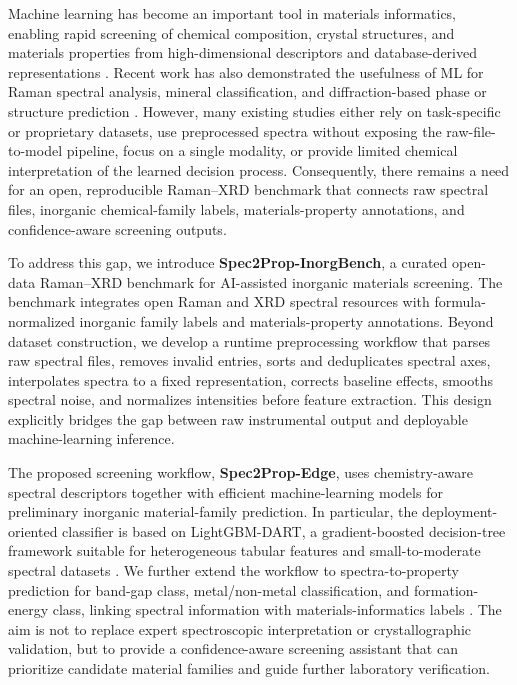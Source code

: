 Machine learning has become an important tool in materials informatics, enabling rapid screening of chemical composition, crystal structures, and materials properties from high-dimensional descriptors and database-derived representations \cite{jain2013materialsproject,ward2018matminer,choudhary2020jarvis,dunn2020matbench,riebesell2025matbenchdiscovery}. Recent work has also demonstrated the usefulness of ML for Raman spectral analysis, mineral classification, and diffraction-based phase or structure prediction \cite{dai2024libsraman,eranti2026ramanencoder,zhang2026physramannet,liu2026ramanclassificationreview,li2024pxrdgen,guo2024xrddeeplearning}. However, many existing studies either rely on task-specific or proprietary datasets, use preprocessed spectra without exposing the raw-file-to-model pipeline, focus on a single modality, or provide limited chemical interpretation of the learned decision process. Consequently, there remains a need for an open, reproducible Raman--XRD benchmark that connects raw spectral files, inorganic chemical-family labels, materials-property annotations, and confidence-aware screening outputs.

To address this gap, we introduce \textbf{Spec2Prop-InorgBench}, a curated open-data Raman--XRD benchmark for AI-assisted inorganic materials screening. The benchmark integrates open Raman and XRD spectral resources with formula-normalized inorganic family labels and materials-property annotations. Beyond dataset construction, we develop a runtime preprocessing workflow that parses raw spectral files, removes invalid entries, sorts and deduplicates spectral axes, interpolates spectra to a fixed representation, corrects baseline effects, smooths spectral noise, and normalizes intensities before feature extraction. This design explicitly bridges the gap between raw instrumental output and deployable machine-learning inference.

The proposed screening workflow, \textbf{Spec2Prop-Edge}, uses chemistry-aware spectral descriptors together with efficient machine-learning models for preliminary inorganic material-family prediction. In particular, the deployment-oriented classifier is based on LightGBM-DART, a gradient-boosted decision-tree framework suitable for heterogeneous tabular features and small-to-moderate spectral datasets \cite{ke2017lightgbm,rashmi2015dart}. We further extend the workflow to spectra-to-property prediction for band-gap class, metal/non-metal classification, and formation-energy class, linking spectral information with materials-informatics labels \cite{xie2018cgcnn,chen2019megnet,goodall2020roost,wang2021crabnet,choudhary2021alignn}. The aim is not to replace expert spectroscopic interpretation or crystallographic validation, but to provide a confidence-aware screening assistant that can prioritize candidate material families and guide further laboratory verification.

